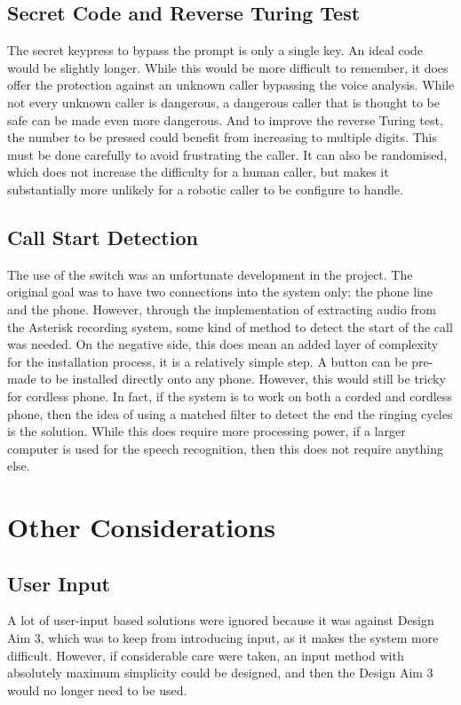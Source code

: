 \documentclass[main.tex]{subfiles}
\begin{document}
\subsection{Secret Code and Reverse Turing Test}
The secret keypress to bypass the prompt is only a single key. An ideal code would be slightly longer. While this would be more difficult to remember, it does offer the protection against an unknown caller bypassing the voice analysis. While not every unknown caller is dangerous, a dangerous caller that is thought to be safe can be made even more dangerous. And to improve the reverse Turing test, the number to be pressed could benefit from increasing to multiple digits. This must be done carefully to avoid frustrating the caller. It can also be randomised, which does not increase the difficulty for a human caller, but makes it substantially more unlikely for a robotic caller to be configure to handle.

\subsection{Call Start Detection}
The use of the switch was an unfortunate development in the project. The original goal was to have two connections into the system only: the phone line and the phone. However, through the implementation of extracting audio from the Asterisk recording system, some kind of method to detect the start of the call was needed. On the negative side, this does mean an added layer of complexity for the installation process, it is a relatively simple step. A button can be pre-made to be installed directly onto any phone. However, this would still be tricky for cordless phone. In fact, if the system is to work on both a corded and cordless phone, then the idea of using a matched filter to detect the end the ringing cycles is the solution. While this does require more processing power, if a larger computer is used for the speech recognition, then this does not require anything else.

\section{Other Considerations}
\subsection{User Input}
A lot of user-input based solutions were ignored because it was against Design Aim 3, which was to keep from introducing input, as it makes the system more difficult. However, if considerable care were taken, an input method with absolutely maximum simplicity could be designed, and then the Design Aim 3 would no longer need to be used.
\end{document}
